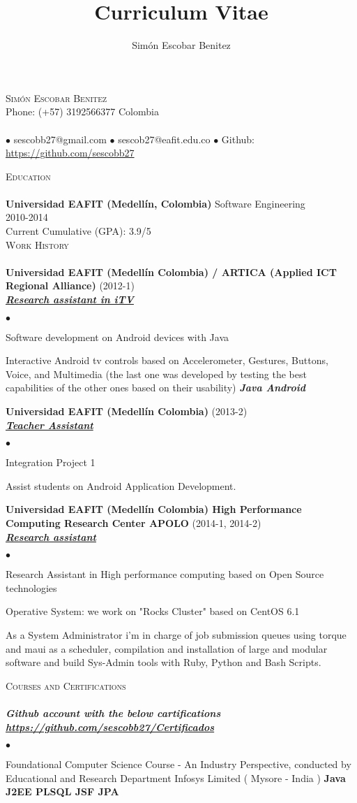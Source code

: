 \documentclass[a4paper]{article}
\title{Curriculum Vitae}
\author{Sim\'on Escobar Benitez}
\newcommand{\lineunder}{\vspace*{-8pt} \\ \hspace*{-18pt} \hrulefill \\}
\newcommand{\header}[1]{{\hspace*{-15pt}\vspace*{6pt}
\textsc{#1}} \vspace*{-6pt} \lineunder}
\newcommand{\employer}[3]{{
\textbf{#1} (#2)\\ \underline{\textbf{\emph{#3}}}\\ }}
\newcommand{\contact}[3]{
\vspace*{-8pt}
\begin{center}
{\LARGE \scshape {#1}}\\ #2 \lineunder #3
\end{center}
\vspace*{-8pt} }
\newenvironment{achievements}{\begin{list}{$\bullet$}{\topsep 0pt \itemsep
-2pt}}{\vspace*{4pt}\end{list}}
\newcommand{\schoolwithcourses}[4]{
\textbf{#1} #2 \\ #3\\ #4\\
\vspace*{5pt} }
\newcommand{\programming}[1]{{\textbf{#1}}}
\newcommand{\emphasys}[1]{\textbf{\emph{#1}}}
\begin{document}
\small
\smallskip
\vspace*{-44pt}
\contact{Sim\'on Escobar Benitez} { Phone: (+57) 3192566377 Colombia } { $\bullet$ sescobb27@gmail.com $\bullet$ sescob27@eafit.edu.co $\bullet$ Github: \url{https://github.com/sescobb27} }
\header{Education}
\schoolwithcourses{Universidad EAFIT (Medell\'in, Colombia)}{Software Engineering} {2010-2014} {Current Cumulative (GPA): 3.9/5}
\header{Work History}
\employer{ Universidad EAFIT (Medell\'in Colombia) / ARTICA (Applied ICT Regional Alliance)} {2012-1} {Research assistant in iTV}
\begin{achievements}
\item Software development on Android devices with Java
\item Interactive Android tv controls based on Accelerometer, Gestures, Buttons, Voice, and Multimedia (the last one was developed by testing the best capabilities of the other ones based on their usability) \emphasys{Java Android}
\end{achievements}
\employer{ Universidad EAFIT (Medell\'in Colombia) }{2013-2}{Teacher Assistant}
\begin{achievements}
\item Integration Project 1
\item Assist students on Android Application Development.
\end{achievements}
\employer{ Universidad EAFIT (Medell\'in Colombia) High Performance Computing Research Center APOLO}{2014-1, 2014-2}{Research assistant}
\begin{achievements}
\item Research Assistant in High performance computing based on Open Source technologies
\item Operative System: we work on "Rocks Cluster" based on CentOS 6.1
\item As a System Administrator i'm in charge of job submission queues using torque and maui as a scheduler, compilation and installation of large and modular software and build Sys-Admin tools with Ruby, Python and Bash Scripts.
\end{achievements}
\header{Courses and Certifications}
\emphasys{Github account with the below cartifications \url{https://github.com/sescobb27/Certificados}}
\begin{achievements}
\item Foundational Computer Science Course - An Industry Perspective, conducted by Educational and Research Department Infosys Limited ( Mysore - India )
\programming{Java J2EE PLSQL JSF JPA}
\end{achievements}
\end{document}
